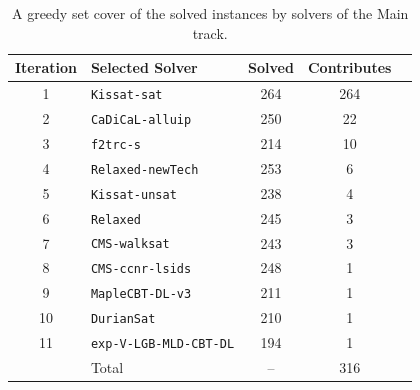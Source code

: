 \documentclass{elsarticle}
\newcommand{\solver}[1]{\texttt{#1}}
\begin{document}
\begin{table}
\centering\small
\begin{tabularx}{\linewidth}{cXccc}
\bf Iteration & \bf Selected Solver & \bf Solved & \bf Contributes \\ %
\hline\arrayrulecolor{lightgray}
\phantom{0}1 & \solver{Kissat-sat} & 264 & 264 \\ %
\phantom{0}2 & \solver{CaDiCaL-alluip} & 250 & \phantom{0}22 \\ %
\phantom{0}3 & \solver{f2trc-s} & 214 & \phantom{0}10 \\ %
\phantom{0}4 & \solver{Relaxed-newTech} & 253 & \phantom{00}6 \\ %
\phantom{0}5 & \solver{Kissat-unsat} & 238 & \phantom{00}4 \\ %
\phantom{0}6 & \solver{Relaxed} & 245 & \phantom{00}3 \\ %
\phantom{0}7 & \solver{CMS-walksat} & 243 & \phantom{00}3 \\ %
\phantom{0}8 & \solver{CMS-ccnr-lsids} & 248 & \phantom{00}1 \\ %
\phantom{0}9 & \solver{MapleCBT-DL-v3} & 211 & \phantom{00}1 \\ %
10 & \solver{DurianSat} & 210 & \phantom{00}1 \\ %
11 & \solver{exp-V-LGB-MLD-CBT-DL} & 194 & \phantom{00}1 \\ %
\hline
 & Total & -- & 316 \\
\end{tabularx}
\caption{A greedy set cover of the solved instances by solvers of the Main track.}
\label{tab:gscMain}
\end{table}
\end{document}
